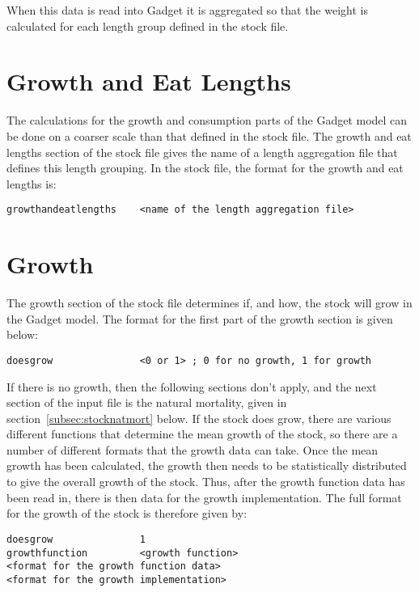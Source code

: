 \documentclass [a4paper, 10pt]{book}
\begin{document}
When this data is read into Gadget it is aggregated so that the weight is calculated for each length group defined in the stock file.

\section{Growth and Eat Lengths}\label{subsec:stockgrowthlength}
The calculations for the growth and consumption parts of the Gadget model can be done on a coarser scale than that defined in the stock file.  The growth and eat lengths section of the stock file gives the name of a length aggregation file that defines this length grouping.  In the stock file, the format for the growth and eat lengths is:

{\small\begin{verbatim}
growthandeatlengths    <name of the length aggregation file>
\end{verbatim}}

\section{Growth}\label{subsec:stockgrowth}
The growth section of the stock file determines if, and how, the stock will grow in the Gadget model.  The format for the first part of the growth section is given below:

{\small\begin{verbatim}
doesgrow               <0 or 1> ; 0 for no growth, 1 for growth
\end{verbatim}}

If there is no growth, then the following sections don't apply, and the next section of the input file is the natural mortality, given in section~\ref{subsec:stocknatmort} below.  If the stock does grow, there are various different functions that determine the mean growth of the stock, so there are a number of different formats that the growth data can take.  Once the mean growth has been calculated, the growth then needs to be statistically distributed to give the overall growth of the stock.  Thus, after the growth function data has been read in, there is then data for the growth implementation.  The full format for the growth of the stock is therefore given by:

{\small\begin{verbatim}
doesgrow               1
growthfunction         <growth function>
<format for the growth function data>
<format for the growth implementation>
\end{verbatim}}
\end{document}
